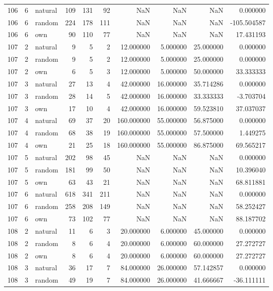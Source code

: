 \begin{table}[htbp]
\begin{tabular}{rrlrrrrrrr}
106 & 6 & natural & 109 & 131 & 92 & NaN & NaN & NaN & 0.000000 \\
106 & 6 & random & 224 & 178 & 111 & NaN & NaN & NaN & -105.504587 \\
106 & 6 & own & 90 & 110 & 77 & NaN & NaN & NaN & 17.431193 \\
107 & 2 & natural & 9 & 5 & 2 & 12.000000 & 5.000000 & 25.000000 & 0.000000 \\
107 & 2 & random & 9 & 5 & 2 & 12.000000 & 5.000000 & 25.000000 & 0.000000 \\
107 & 2 & own & 6 & 5 & 3 & 12.000000 & 5.000000 & 50.000000 & 33.333333 \\
107 & 3 & natural & 27 & 13 & 4 & 42.000000 & 16.000000 & 35.714286 & 0.000000 \\
107 & 3 & random & 28 & 14 & 5 & 42.000000 & 16.000000 & 33.333333 & -3.703704 \\
107 & 3 & own & 17 & 10 & 4 & 42.000000 & 16.000000 & 59.523810 & 37.037037 \\
107 & 4 & natural & 69 & 37 & 20 & 160.000000 & 55.000000 & 56.875000 & 0.000000 \\
107 & 4 & random & 68 & 38 & 19 & 160.000000 & 55.000000 & 57.500000 & 1.449275 \\
107 & 4 & own & 21 & 25 & 18 & 160.000000 & 55.000000 & 86.875000 & 69.565217 \\
107 & 5 & natural & 202 & 98 & 45 & NaN & NaN & NaN & 0.000000 \\
107 & 5 & random & 181 & 99 & 50 & NaN & NaN & NaN & 10.396040 \\
107 & 5 & own & 63 & 43 & 21 & NaN & NaN & NaN & 68.811881 \\
107 & 6 & natural & 618 & 341 & 211 & NaN & NaN & NaN & 0.000000 \\
107 & 6 & random & 258 & 208 & 149 & NaN & NaN & NaN & 58.252427 \\
107 & 6 & own & 73 & 102 & 77 & NaN & NaN & NaN & 88.187702 \\
108 & 2 & natural & 11 & 6 & 3 & 20.000000 & 6.000000 & 45.000000 & 0.000000 \\
108 & 2 & random & 8 & 6 & 4 & 20.000000 & 6.000000 & 60.000000 & 27.272727 \\
108 & 2 & own & 8 & 6 & 4 & 20.000000 & 6.000000 & 60.000000 & 27.272727 \\
108 & 3 & natural & 36 & 17 & 7 & 84.000000 & 26.000000 & 57.142857 & 0.000000 \\
108 & 3 & random & 49 & 19 & 7 & 84.000000 & 26.000000 & 41.666667 & -36.111111 \\

\end{tabular}
\end{table}
